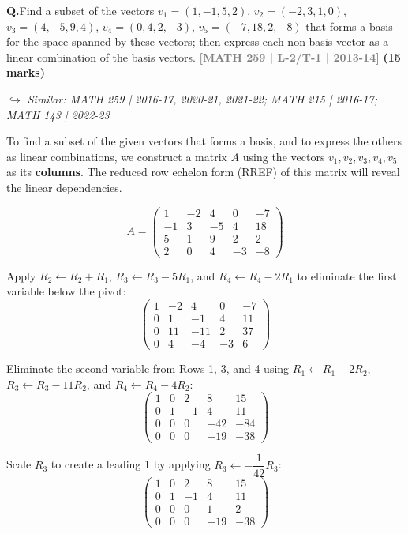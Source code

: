 \documentclass[12pt,a3paper]{article}
\newcommand{\yr}[1]{\hfill\textcolor{gray}{\small\textbf{[#1]}}}
\newcommand{\mk}[1]{\textcolor{orange!70!black}{\small\textbf{(#1 marks)}}}
\newcommand{\variant}[1]{\par\vspace{1pt}\textcolor{blue!50!black}%
  {\footnotesize\textit{$\hookrightarrow$ Similar: #1}}}
\newcounter{qnum}
\newcommand{\Q}[1]{%
  \needspace{4\baselineskip}
  \refstepcounter{qnum}
  \vspace{6pt}
  \noindent\textbf{Q\theqnum.}\enspace #1\par
}
\begin{document}
\Q{Find a subset of the vectors $v_1 = (1,-1,5,2)$, $v_2 = (-2,3,1,0)$, $v_3 = (4,-5,9,4)$, $v_4 = (0,4,2,-3)$, $v_5 = (-7,18,2,-8)$ that forms a basis for the space spanned by these vectors; then express each non-basis vector as a linear combination of the basis vectors.
\yr{MATH 259 | L-2/T-1 | 2013-14} \mk{15}
\variant{MATH 259 | 2016-17, 2020-21, 2021-22; MATH 215 | 2016-17; MATH 143 | 2022-23}}
\begin{tcolorbox}[enhanced,breakable,
  colback=cC!4,colframe=cC,boxrule=0.8pt,arc=5pt,
  title={\textbf{Answer --- Basis and Linear Combinations}},
  fonttitle=\bfseries\color{white},colbacktitle=cC]

To find a subset of the given vectors that forms a basis, and to express the others as linear combinations, we construct a matrix $A$ using the vectors $v_1, v_2, v_3, v_4, v_5$ as its \textbf{columns}. The reduced row echelon form (RREF) of this matrix will reveal the linear dependencies.

\[
A = \begin{pmatrix}
1 & -2 & 4 & 0 & -7 \\
-1 & 3 & -5 & 4 & 18 \\
5 & 1 & 9 & 2 & 2 \\
2 & 0 & 4 & -3 & -8
\end{pmatrix}
\]

Apply $R_2 \leftarrow R_2 + R_1$, $R_3 \leftarrow R_3 - 5R_1$, and $R_4 \leftarrow R_4 - 2R_1$ to eliminate the first variable below the pivot:
\[
\begin{pmatrix}
1 & -2 & 4 & 0 & -7 \\
0 & 1 & -1 & 4 & 11 \\
0 & 11 & -11 & 2 & 37 \\
0 & 4 & -4 & -3 & 6
\end{pmatrix}
\]

Eliminate the second variable from Rows 1, 3, and 4 using $R_1 \leftarrow R_1 + 2R_2$, $R_3 \leftarrow R_3 - 11R_2$, and $R_4 \leftarrow R_4 - 4R_2$:
\[
\begin{pmatrix}
1 & 0 & 2 & 8 & 15 \\
0 & 1 & -1 & 4 & 11 \\
0 & 0 & 0 & -42 & -84 \\
0 & 0 & 0 & -19 & -38
\end{pmatrix}
\]

Scale $R_3$ to create a leading 1 by applying $R_3 \leftarrow -\dfrac{1}{42}R_3$:
\[
\begin{pmatrix}
1 & 0 & 2 & 8 & 15 \\
0 & 1 & -1 & 4 & 11 \\
0 & 0 & 0 & 1 & 2 \\
0 & 0 & 0 & -19 & -38
\end{pmatrix}
\]


\end{tcolorbox}
\end{document}
